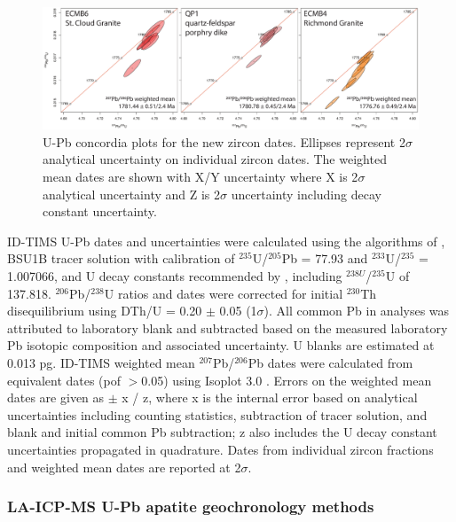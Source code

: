 \documentclass[11pt,letterpaper]{article}
\begin{document}
\begin{figure}[!ht]
\noindent\includegraphics[width=\textwidth]{./figures/SI_zircon_concordia.pdf}
\centering
\caption{\small{U-Pb concordia plots for the new zircon dates. Ellipses represent  2$\sigma$ analytical uncertainty on individual zircon dates. The weighted mean dates are shown with X/Y uncertainty where X is 2$\sigma$ analytical uncertainty and Z is 2$\sigma$ uncertainty including decay constant uncertainty.}}
\label{fig:zircon_concordia}
\end{figure}

ID-TIMS U-Pb dates and uncertainties were calculated using the algorithms of \cite{Schmitz2007b}, BSU1B tracer solution with calibration of $^{235}$U/$^{205}$Pb = 77.93 and $^{233}$U/$^{235}$ = 1.007066, and U decay constants recommended by \cite{Hiess2012a}, including $^{238U}$/$^{235}$U of 137.818. $^{206}$Pb/$^{238}$U ratios and dates were corrected for initial $^{230}$Th disequilibrium using DTh/U = 0.20 $\pm$ 0.05 (1$\sigma$). All common Pb in analyses was attributed to laboratory blank and subtracted based on the measured laboratory Pb isotopic composition and associated uncertainty. U blanks are estimated at 0.013 pg. ID-TIMS weighted mean $^{207}$Pb/$^{206}$Pb dates were calculated from equivalent dates (pof $>$0.05) using Isoplot 3.0 \citep{Ludwig2003a}. Errors on the weighted mean dates are given as $\pm$ x / z, where x is the internal error based on analytical uncertainties including counting statistics, subtraction of tracer solution, and blank and initial common Pb subtraction; z also includes the U decay constant uncertainties propagated in quadrature. Dates from individual zircon fractions and weighted mean dates are reported at 2$\sigma$.

\subsubsection*{LA-ICP-MS U-Pb apatite geochronology methods}
\end{document}
